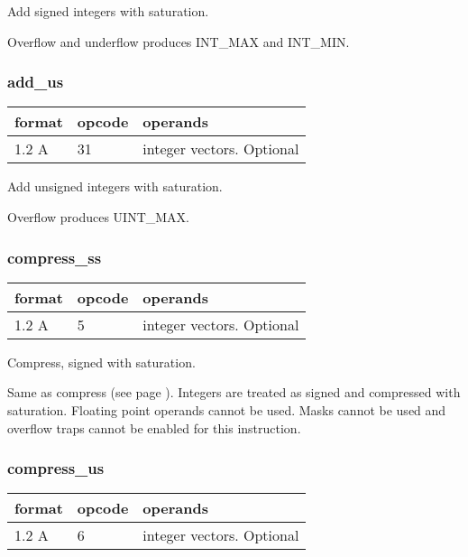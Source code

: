 \documentclass[forwardcom.tex]{subfiles}
\begin{document}
Add signed integers with saturation.

Overflow and underflow produces INT\_MAX and INT\_MIN.

\subsubsection{add\_us}
\label{table:addUsInstruction}
\begin{tabular}{|p{12mm}|p{12mm}|p{110mm}|}
\hline
\bfseries format & \bfseries opcode & \bfseries operands \\ \hline
1.2 A & 31 & integer vectors. Optional \\ \hline
\end{tabular}
\vspace{2mm}

Add unsigned integers with saturation.

Overflow produces UINT\_MAX.

\subsubsection{compress\_ss}
\label{table:compressSsInstruction}
\begin{tabular}{|p{12mm}|p{12mm}|p{110mm}|}
\hline
\bfseries format & \bfseries opcode & \bfseries operands \\ \hline
1.2 A & 5 & integer vectors. Optional \\ \hline
\end{tabular}
\vspace{2mm}

Compress, signed with saturation.
\vspace{2mm}

Same as compress (see page \pageref{table:compressInstruction}). Integers are treated as signed and compressed with saturation. Floating point operands cannot be used. 
Masks cannot be used and overflow traps cannot be enabled for this instruction.
\vspace{2mm}

\subsubsection{compress\_us}
\label{table:compressUsInstruction}
\begin{tabular}{|p{12mm}|p{12mm}|p{110mm}|}
\hline
\bfseries format & \bfseries opcode & \bfseries operands \\ \hline
1.2 A & 6 & integer vectors. Optional \\ \hline
\end{tabular}
\vspace{2mm}
\end{document}
